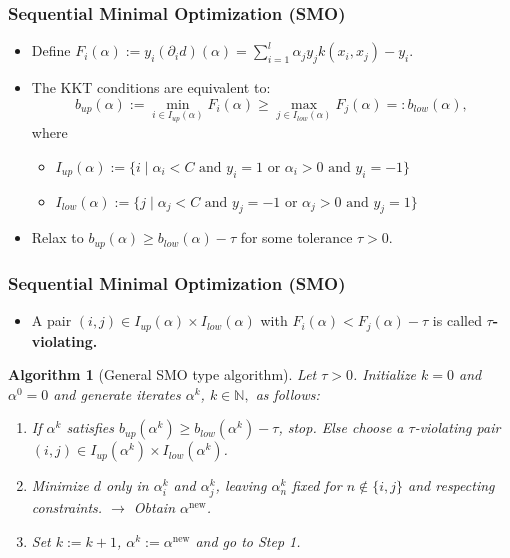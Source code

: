 \documentclass[12pt, compress]{beamer}
\newcommand{\titleC}{Sequential Minimal Optimization (SMO)}
\newtheorem{algorithm}{Algorithm}
\begin{document}
\begin{frame}
\frametitle{\titleC}
\begin{itemize}
	\item Define $F_i(\alpha) := y_i (\partial_i d)(\alpha) = \sum_{i = 1}^l \alpha_j y_j k(x_i,x_j) - y_i$.
	\item The KKT conditions are equivalent to:
	\begin{equation*}\label{equiv_KKT}
	b_{up}(\alpha) := \min_{i \in I_{up}(\alpha)} F_i(\alpha) \geq \max_{j \in I_{low}(\alpha)} F_j(\alpha) =: b_{low}(\alpha),
	\end{equation*}
	where \begin{itemize}
		\item $I_{up}(\alpha) := \{ i \mid  \alpha_i < C \text{ and } y_i = 1 \text{ or } \alpha_i > 0 \text{ and } y_i = -1 \}$
		\item $I_{low}(\alpha) := \{ j \mid \alpha_j < C \text{ and } y_j = -1 \text{ or } \alpha_j > 0 \text{ and } y_j = 1 \}$
	
	\end{itemize}
	\item Relax to $b_{up}(\alpha) \geq b_{low}(\alpha) - \tau$ for some tolerance $\tau > 0$.
\end{itemize}
\end{frame}

\begin{frame}
\frametitle{\titleC}
	\begin{itemize}
		\item A pair $(i,j) \in I_{up}(\alpha) \times I_{low}(\alpha)$ with $F_i(\alpha) < F_j(\alpha) - \tau$ is called \textbf{\alert{$\tau$-violating. }}
	\end{itemize}
	\begin{algorithm}[General SMO type algorithm]\label{GSMO} Let $\tau > 0$. Initialize $k = 0 $ and $\alpha^0 = 0$ and generate iterates $\alpha^k$, $k \in \mathbb{N},$ as follows: 
		\begin{enumerate}
			\item If $\alpha^k$ satisfies $b_{up}(\alpha^k) \geq b_{low}(\alpha^k) - \tau$, stop. Else choose a $\tau$-violating pair $(i,j) \in I_{up}(\alpha^k) \times I_{low}(\alpha^k)$.
			\item Minimize $d$ only in $\alpha^k_i$ and $\alpha^k_j$, leaving $\alpha^k_n$ fixed for $n \notin \{i,j\}$ and respecting constraints. $\rightarrow$ Obtain $\alpha^{\text{new}}$.
			\item Set $k := k+1$, $\alpha^k := \alpha^{\text{new}}$ and go to Step 1.
		\end{enumerate}
	\end{algorithm}
\end{frame}
\end{document}
